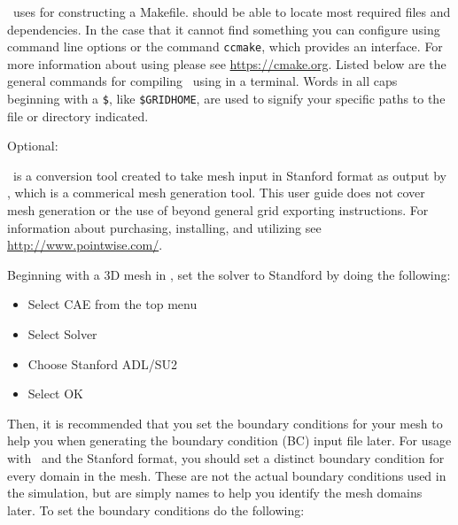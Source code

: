 \grid\, uses  for constructing a Makefile.  should be able to locate most required files and dependencies. In the case that it cannot find something you can configure  using command line options or the command \texttt{ccmake}, which provides an interface. For more information about using  please see \url{https://cmake.org}. Listed below are the general commands for compiling \grid\, using  in a  terminal. Words in all caps beginning with a \texttt{\$}, like \texttt{\$GRIDHOME}, are used to signify your specific paths to the file or directory indicated.






Optional:



\grid\, is a conversion tool created to take mesh input in Stanford format as output by , which is a commerical mesh generation tool. This user guide does not cover mesh generation or the use of  beyond general grid exporting instructions. For information about purchasing, installing, and utilizing  see \url{http://www.pointwise.com/}.


Beginning with a 3D mesh in , set the solver to Standford by doing the following:

\begin{itemize}
	\item Select CAE from the top menu
	\item Select Solver
	\item Choose Stanford ADL/SU2
	\item Select OK	
\end{itemize}

Then, it is recommended that you set the boundary conditions for your mesh to help you when generating the boundary condition (BC) input file later. For usage with \grid\, and the Stanford format, you should set a distinct boundary condition for every domain in the mesh. These are not the actual boundary conditions used in the simulation, but are simply names to help you identify the mesh domains later. To set the boundary conditions do the following:

